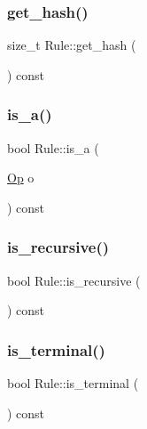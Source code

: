 \mbox{\label{class_rule_a62e4d931266a65d4aad9ca3c058d7e25}} 
\subsubsection{\texorpdfstring{get\+\_\+hash()}{get\_hash()}}
{\footnotesize\ttfamily size\+\_\+t Rule\+::get\+\_\+hash (\begin{DoxyParamCaption}{ }\end{DoxyParamCaption}) const\hspace{0.3cm}{\ttfamily [inline]}}

\mbox{\label{class_rule_abdf29814185995dbdc09b4d62658da2e}} 
\subsubsection{\texorpdfstring{is\+\_\+a()}{is\_a()}}
{\footnotesize\ttfamily bool Rule\+::is\+\_\+a (\begin{DoxyParamCaption}\item[{\hyperlink{_ops_8h_a588e6b56097e045c733b60d25c4d45ab}{Op}}]{o }\end{DoxyParamCaption}) const\hspace{0.3cm}{\ttfamily [inline]}}

\mbox{\label{class_rule_a190786a2f5ab452ac0a557c44b8790ed}} 
\subsubsection{\texorpdfstring{is\+\_\+recursive()}{is\_recursive()}}
{\footnotesize\ttfamily bool Rule\+::is\+\_\+recursive (\begin{DoxyParamCaption}{ }\end{DoxyParamCaption}) const\hspace{0.3cm}{\ttfamily [inline]}}

\mbox{\label{class_rule_a9d557e302f94bd85f5505733e8856f97}} 
\subsubsection{\texorpdfstring{is\+\_\+terminal()}{is\_terminal()}}
{\footnotesize\ttfamily bool Rule\+::is\+\_\+terminal (\begin{DoxyParamCaption}{ }\end{DoxyParamCaption}) const\hspace{0.3cm}{\ttfamily [inline]}}

